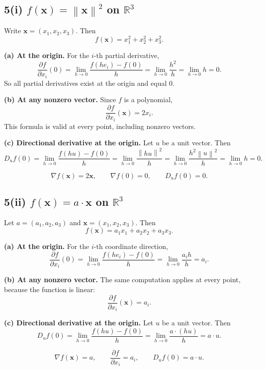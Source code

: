 \documentclass[11pt]{article}
\newcommand{\R}{\mathbb{R}}
\newcommand{\norm}[1]{\left\lVert #1 \right\rVert}
\begin{document}
\subsection{5(i) \(f(\mathbf x)=\norm{\mathbf x}^2\) on \(\R^3\)}

Write \(\mathbf x=(x_1,x_2,x_3)\). Then
\[
f(\mathbf x)=x_1^2+x_2^2+x_3^2.
\]

\textbf{(a) At the origin.} For the \(i\)-th partial derivative,
\[
\frac{\partial f}{\partial x_i}(0)
=\lim_{h\to0}\frac{f(he_i)-f(0)}{h}
=\lim_{h\to0}\frac{h^2}{h}
=\lim_{h\to0}h=0.
\]
So all partial derivatives exist at the origin and equal \(0\).

\textbf{(b) At any nonzero vector.} Since \(f\) is a polynomial,
\[
\frac{\partial f}{\partial x_i}(\mathbf x)=2x_i.
\]
This formula is valid at every point, including nonzero vectors.

\textbf{(c) Directional derivative at the origin.} Let \(u\) be a unit vector. Then
\[
D_u f(0)=\lim_{h\to0}\frac{f(hu)-f(0)}{h}
=\lim_{h\to0}\frac{\norm{hu}^2}{h}
=\lim_{h\to0}\frac{h^2\norm{u}^2}{h}
=\lim_{h\to0}h=0.
\]

\begin{answerbox}
\[
\boxed{\nabla f(\mathbf x)=2\mathbf x,
\qquad \nabla f(0)=0,
\qquad D_u f(0)=0.}
\]
\end{answerbox}

\subsection{5(ii) \(f(\mathbf x)=a\cdot\mathbf x\) on \(\R^3\)}

Let \(a=(a_1,a_2,a_3)\) and \(\mathbf x=(x_1,x_2,x_3)\). Then
\[
f(\mathbf x)=a_1x_1+a_2x_2+a_3x_3.
\]

\textbf{(a) At the origin.} For the \(i\)-th coordinate direction,
\[
\frac{\partial f}{\partial x_i}(0)
=\lim_{h\to0}\frac{f(he_i)-f(0)}{h}
=\lim_{h\to0}\frac{a_i h}{h}=a_i.
\]

\textbf{(b) At any nonzero vector.} The same computation applies at every point, because the function is linear:
\[
\frac{\partial f}{\partial x_i}(\mathbf x)=a_i.
\]

\textbf{(c) Directional derivative at the origin.} Let \(u\) be a unit vector. Then
\[
D_u f(0)=\lim_{h\to0}\frac{f(hu)-f(0)}{h}
=\lim_{h\to0}\frac{a\cdot(hu)}{h}
=a\cdot u.
\]

\begin{answerbox}
\[
\boxed{\nabla f(\mathbf x)=a,
\qquad \frac{\partial f}{\partial x_i}=a_i,
\qquad D_u f(0)=a\cdot u.}
\]
\end{answerbox}
\end{document}
